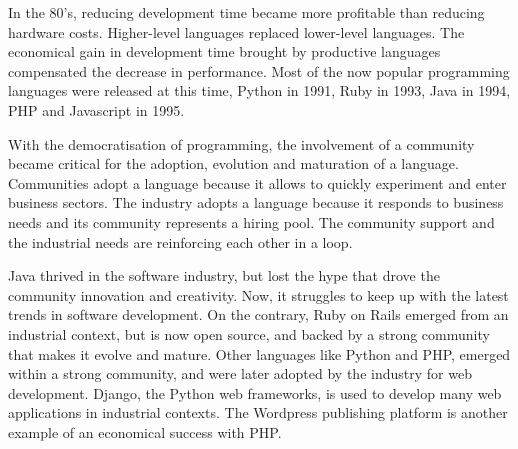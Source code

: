 In the 80's, reducing development time became more profitable than reducing hardware costs.
Higher-level languages replaced lower-level languages.
The economical gain in development time brought by productive languages compensated the decrease in performance.
Most of the now popular programming languages were released at this time, Python in 1991, Ruby in 1993, Java in 1994, PHP and Java\-script in 1995.

With the democratisation of programming, the involvement of a community became critical for the adoption, evolution and maturation of a language.
Communities adopt a language because it allows to quickly experiment and enter business sectors.
The industry adopts a language because it responds to business needs and its community represents a hiring pool.
The community support and the industrial needs are reinforcing each other in a loop.

Java thrived in the software industry, but lost the hype that drove the community innovation and creativity.
Now, it struggles to keep up with the latest trends in software development.
On the contrary, Ruby on Rails emerged from an industrial context, but is now open source, and backed by a strong community that makes it evolve and mature.
Other languages like Python and PHP, emerged within a strong community, and were later adopted by the industry for web development.
Django, the Python web frameworks, is used to develop many web applications in industrial contexts.
The Wordpress publishing platform is another example of an economical success with PHP.



